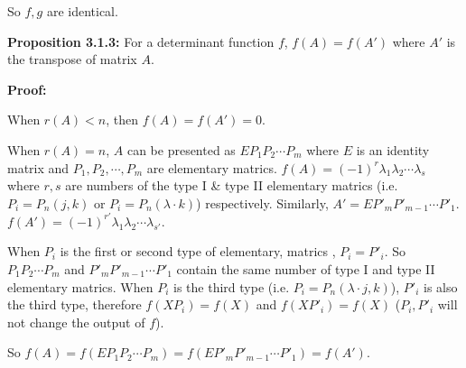 \documentclass{article}
\begin{document}
So \(f, g\) are identical.

\vspace{2mm}
\textbf{Proposition 3.1.3:}
For a determinant function \(f\), \(f(A)=f(A')\) where \(A'\) is
the transpose of matrix \(A\).

\vspace{2mm}
\textbf{Proof:}

When \(r(A)<n\), then \(f(A)=f(A')=0\).

When \(r(A)=n\), \(A\) can be presented as \(EP_1P_2\cdots P_m\) where
\(E\) is an identity matrix and \(P_1, P_2, \cdots, P_m\) are elementary
matrics. \(f(A)=(-1)^r\lambda_1\lambda_2\cdots \lambda_s\) where \(r,s\)
are numbers of the type I \& type II elementary matrics (i.e. \(P_i=P_n(j,k)\) or
\(P_i=P_n(\lambda\cdot k)\)) respectively. 
Similarly, \(A'=EP'_mP'_{m-1}\cdots P'_1\). 
\(f(A')=(-1)^{r'}\lambda_1\lambda_2\cdots \lambda_{s'}\).

When \(P_i\) is the
first or second type of elementary, matrics , \(P_i=P'_i\). So \(P_1P_2\cdots P_m\)
and \(P'_mP'_{m-1}\cdots P'_1\) contain the same number of type I and type
II elementary matrics.
When \(P_i\) is the
third type (i.e. \(P_i=P_n(\lambda\cdot j, k)\)), \(P'_i\) is also the
third type, therefore \(f(XP_i)=f(X)\) and \(f(XP'_i)=f(X)\) (\(P_i,
P'_i\) will not change the output of \(f\)).

So \(f(A)=f(EP_1P_2\cdots P_m)=f(EP'_mP'_{m-1}\cdots P'_1)=f(A')\).
\end{document}
